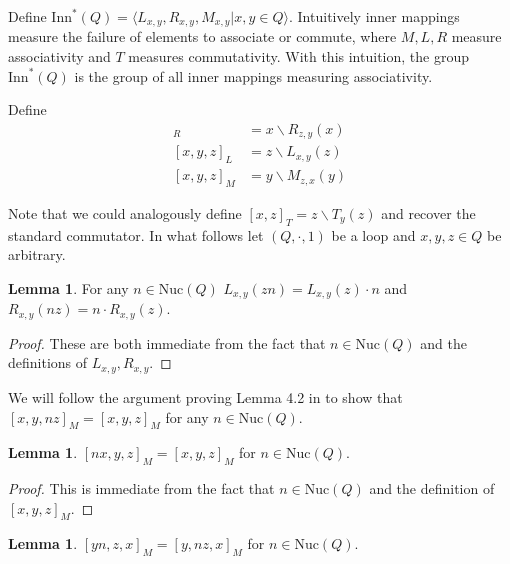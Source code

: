 \documentclass[12pt, twoside, openright]{report}
\theoremstyle{definition}
\newtheorem{lem}[thm]{Lemma}
\newcommand{\ldv}{\backslash}       %
\newcommand{\nuc}{\text{Nuc}}       %
\newcommand{\inn}{\text{Inn}}       %
\begin{document}
Define $\inn^*(Q) = \langle L_{x, y}, R_{x, y}, M_{x, y} | x, y\in Q\rangle$. Intuitively inner
  mappings measure the failure of elements to associate or commute, where $M, L, R$ measure
  associativity and $T$ measures commutativity. With this intuition, the group $\inn^*(Q)$ is
  the group of all inner mappings measuring associativity.

Define
  \begin{align*}
    [x, y, z]_R &= x\ldv R_{z, y}(x)\\
    [x, y, z]_L &= z\ldv L_{x, y}(z)\\
    [x, y, z]_M &= y\ldv M_{z, x}(y)
  \end{align*}

Note that we could analogously define $[x, z]_T = z\ldv T_y(z)$ and recover the standard commutator.
  In what follows let $(Q, \cdot, 1)$ be a loop and $x, y, z\in Q$ be arbitrary.

\begin{lem}\label{lem-LR}
  For any $n\in\nuc(Q)$ $L_{x, y}(zn) = L_{x, y}(z)\cdot n$ and $R_{x, y}(nz) = n\cdot R_{x, y}(z)$.
\end{lem}

\begin{proof}
  These are both immediate from the fact that $n\in\nuc(Q)$ and the definitions of $L_{x, y}, R_{x, y}$.
\end{proof}

We will follow the argument proving Lemma 4.2 in \cite{DiaCC} to show that
  $[x, y, nz]_M = [x, y, z]_M$ for any $n\in\nuc(Q)$.
\begin{lem}\label{lem-M1}
  $[nx, y, z]_M = [x, y, z]_M$ for $n\in\nuc(Q)$.
\end{lem}

\begin{proof}
  This is immediate from the fact that $n\in\nuc(Q)$ and the definition of $[x, y, z]_M$.
\end{proof}

\begin{lem}\label{lem-M2}
  $[yn, z, x]_M = [y, nz, x]_M$ for $n\in\nuc(Q)$.
\end{lem}
\end{document}
